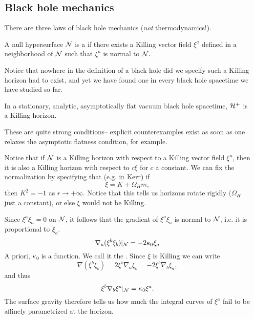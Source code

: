
\subsection*{Black hole mechanics}
There are three laws of black hole mechanics (\emph{not} thermodynamics!).
\begin{defn}
    A null hypersurface $\mathcal N$ is a  if there exists a Killing vector field $\xi^a$ defined in a neighborhood of $\mathcal N$ such that $\xi^a$ is normal to $\mathcal N.$
\end{defn}
Notice that nowhere in the definition of a black hole did we specify such a Killing horizon had to exist, and yet we have found one in every black hole spacetime we have studied so far.
\begin{thm}[Hawking 1972]
    In a stationary, analytic, asymptotically flat vacuum black hole spacetime, $\mathcal H^+$ is a Killing horizon.
\end{thm}
These are quite strong conditions-- explicit counterexamples exist as soon as one relaxes the asymptotic flatness condition, for example. 

Notice that if $\mathcal N$ is a Killing horizon with respect to a Killing vector field $\xi^a$, then it is also a Killing horizon with respect to $c\xi$ for $c$ a constant. We can fix the normalization by specifying that (e.g. in Kerr) if
\begin{equation}
    \xi = K+\Omega_H m,
\end{equation}
then $K^2=-1$ as $r\to +\infty$. Notice that this tells us horizons rotate rigidly ($\Omega_H$ just a constant), or else $\xi$ would not be Killing.

Since $\xi^a\xi_a=0$ on $\mathcal N$, it follows that the gradient of $\xi^a\xi_a$ is normal to $\mathcal N$, i.e. it is proportional to $\xi_a$.
\begin{equation}
    \nabla_a(\xi^b \xi_b)|_\mathcal N = -2 \kappa_0 \xi_a
\end{equation}
A priori, $\kappa_0$ is a function. We call it the . Since $\xi$ is Killing we can write
\begin{equation}
    \nabla(\xi^b \xi_b) = 2 \xi^b \nabla_a \xi_b = -2 \xi^b \nabla_b \xi_a,
\end{equation}
and thus
\begin{equation}
    \xi^b \nabla_b \xi^a|_{\mathcal N} = \kappa_0 \xi^a.
\end{equation}
The surface gravity therefore tells us how much the integral curves of $\xi^a$ fail to be affinely parametrized at the horizon.


